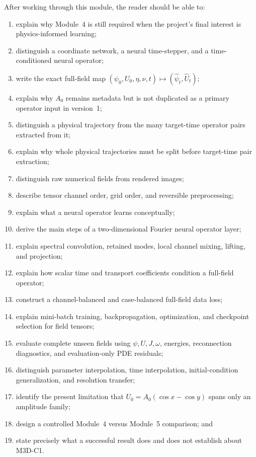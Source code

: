 \documentclass[11pt]{article}
\begin{document}
After working through this module, the reader should be able to:
\begin{enumerate}[label=\arabic*.]
  \item explain why Module~4 is still required when the project's final interest is physics-informed learning;
  \item distinguish a coordinate network, a neural time-stepper, and a time-conditioned neural operator;
  \item write the exact full-field map $(\psi_0,U_0,\eta,\nu,t)\mapsto(\widehat\psi_t,\widehat U_t)$;
  \item explain why $A_0$ remains metadata but is not duplicated as a primary operator input in version~1;
  \item distinguish a physical trajectory from the many target-time operator pairs extracted from it;
  \item explain why whole physical trajectories must be split before target-time pair extraction;
  \item distinguish raw numerical fields from rendered images;
  \item describe tensor channel order, grid order, and reversible preprocessing;
  \item explain what a neural operator learns conceptually;
  \item derive the main steps of a two-dimensional Fourier neural operator layer;
  \item explain spectral convolution, retained modes, local channel mixing, lifting, and projection;
  \item explain how scalar time and transport coefficients condition a full-field operator;
  \item construct a channel-balanced and case-balanced full-field data loss;
  \item explain mini-batch training, backpropagation, optimization, and checkpoint selection for field tensors;
  \item evaluate complete unseen fields using $\psi,U,J,\omega$, energies, reconnection diagnostics, and evaluation-only PDE residuals;
  \item distinguish parameter interpolation, time interpolation, initial-condition generalization, and resolution transfer;
  \item identify the present limitation that $U_0=A_0(\cos x-\cos y)$ spans only an amplitude family;
  \item design a controlled Module~4 versus Module~5 comparison; and
  \item state precisely what a successful result does and does not establish about M3D-C1.
\end{enumerate}
\end{document}

